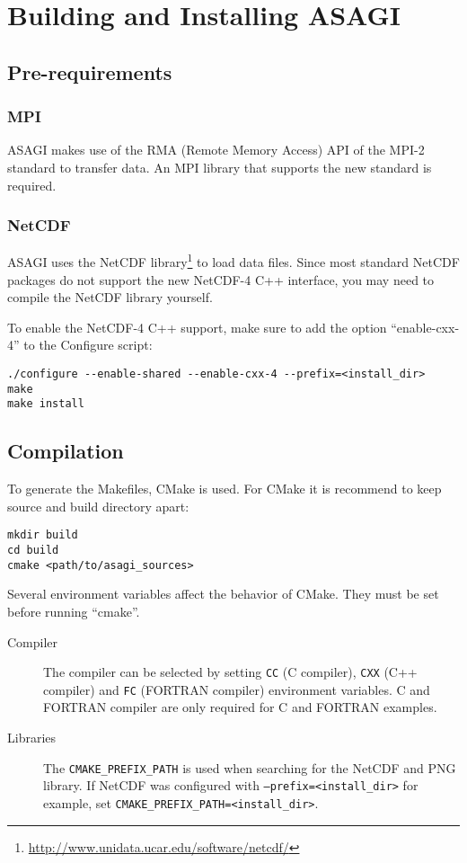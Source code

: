 \section{Building and Installing ASAGI}

\subsection{Pre-requirements}

\subsubsection{MPI}

ASAGI makes use of the RMA (Remote Memory Access) API of the MPI-2 standard to transfer data. An MPI library that supports the new standard is required.

\subsubsection{NetCDF}

ASAGI uses the NetCDF library\footnote{\url{http://www.unidata.ucar.edu/software/netcdf/}} to load data files. Since most standard NetCDF packages do not support the new NetCDF-4 C++ interface, you may need to compile the NetCDF library yourself.

To enable the NetCDF-4 C++ support, make sure to add the option ``enable-cxx-4'' to the Configure script:

\lstset{language=bash}
\begin{lstlisting}
./configure --enable-shared --enable-cxx-4 --prefix=<install_dir>
make
make install
\end{lstlisting}

\subsection{Compilation}

To generate the Makefiles, CMake is used. For CMake it is recommend to keep source and build directory apart:

\lstset{language=bash}
\begin{lstlisting}
mkdir build
cd build
cmake <path/to/asagi_sources>
\end{lstlisting}

Several environment variables affect the behavior of CMake. They must be set before running ``cmake''.

\begin{description}
 \item[Compiler] The compiler can be selected by setting \texttt{CC} (C compiler), \texttt{CXX} (C++ compiler) and \texttt{FC} (FORTRAN compiler) environment variables. C and FORTRAN compiler are only required for C and FORTRAN examples.
 \item[Libraries] The \texttt{CMAKE\_PREFIX\_PATH} is used when searching for the NetCDF and PNG library. If NetCDF was configured with \texttt{--prefix=<install\_dir>} for example, set \texttt{CMAKE\_PREFIX\_PATH=<install\_dir>}.
\end{description}

